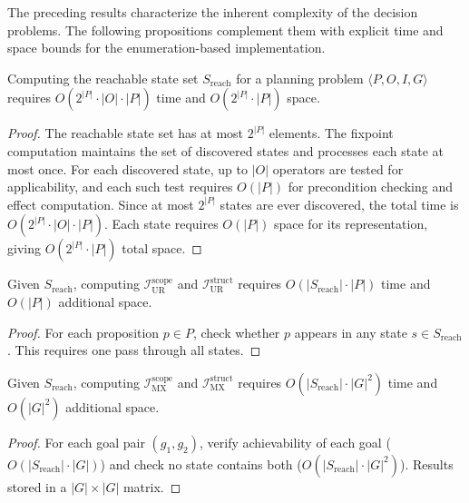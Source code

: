 The preceding results characterize the inherent complexity of the decision problems. The following propositions complement them with explicit time and space bounds for the enumeration-based implementation.

\begin{prop}
    \label{prop:reach_complexity}
    Computing the reachable state set $S_{\text{reach}}$ for a planning problem $\langle P, O, I, G \rangle$ requires $O(2^{|P|} \cdot |O| \cdot |P|)$ time and $O(2^{|P|} \cdot |P|)$ space.
\end{prop}
\begin{proof}
    The reachable state set has at most $2^{|P|}$ elements. The fixpoint computation maintains the set of discovered states and processes each state at most once. For each discovered state, up to $|O|$ operators are tested for applicability, and each such test requires $O(|P|)$ for precondition checking and effect computation. Since at most $2^{|P|}$ states are ever discovered, the total time is $O(2^{|P|} \cdot |O| \cdot |P|)$. Each state requires $O(|P|)$ space for its representation, giving $O(2^{|P|} \cdot |P|)$ total space.
\end{proof}

\begin{prop}
    \label{prop:ur_complexity}
    Given $S_{\text{reach}}$, computing $\mathcal{I}^{\text{scope}}_{\text{UR}}$ and $\mathcal{I}^{\text{struct}}_{\text{UR}}$ requires $O(|S_{\text{reach}}| \cdot |P|)$ time and $O(|P|)$ additional space.
\end{prop}
\begin{proof}
    For each proposition $p \in P$, check whether $p$ appears in any state $s \in S_{\text{reach}}$. This requires one pass through all states.
\end{proof}

\begin{prop}
    \label{prop:mx_complexity}
    Given $S_{\text{reach}}$, computing $\mathcal{I}^{\text{scope}}_{\text{MX}}$ and $\mathcal{I}^{\text{struct}}_{\text{MX}}$ requires $O(|S_{\text{reach}}| \cdot |G|^2)$ time and $O(|G|^2)$ additional space.
\end{prop}
\begin{proof}
    For each goal pair $(g_1, g_2)$, verify achievability of each goal ($O(|S_{\text{reach}}| \cdot |G|)$) and check no state contains both ($O(|S_{\text{reach}}| \cdot |G|^2)$). Results stored in a $|G| \times |G|$ matrix.
\end{proof}

